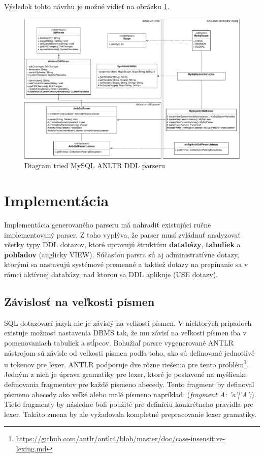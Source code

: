 Výsledok tohto návrhu je možné vidieť na obrázku \ref{fig:class_diagram_antlr}.
\begin{figure}[H]
\begin{center}
\includegraphics[width=15cm]{figures/antlr_design.pdf}
\caption{Diagram tried MySQL ANLTR DDL parseru}
\label{fig:class_diagram_antlr}
\end{center}
\end{figure}

\section{Implementácia}
Implementácia generovaného parseru má nahradiť existujúci ručne implementovaný parser. Z toho vyplýva, že parser musí zvládnuť analyzovať všetky typy DDL dotazov, ktoré upravujú štruktúru \textbf{databázy}, \textbf{tabuliek} a \textbf{pohľadov} (anglicky VIEW). Súčasťou parsra sú aj administratívne dotazy, ktorými sa nastavujú systémové premenné a taktiež dotazy na prepínanie sa v rámci aktívnej databázy, nad ktorou sa DDL aplikuje (USE dotazy).

\subsection{Závislosť na veľkosti písmen}
SQL dotazovací jazyk nie je závislý na veľkosti písmen. V niektorých prípadoch existuje možnosť nastavenia DBMS tak, že mu závisí na veľkosti písmen iba v pomenovaniach tabuliek a stĺpcov. Bohužiaľ parsre vygenerované ANTLR nástrojom sú závisle od veľkosti písmen podľa toho, ako sú definované jednotlivé u tokenov pre lexer. ANTLR podporuje dve rôzne riešenia pre tento problém\footnote{\url{https://github.com/antlr/antlr4/blob/master/doc/case-insensitive-lexing.md}}. Jedným z nich je úprava gramatiky pre lexer, ktoré je postavené na myšlienke definovania fragmentov pre každé písmeno abecedy. Tento fragment by definoval písmeno abecedy ako veľké alebo malé písmeno napríklad: (\textit{fragment A: 'a'|'A';}). Tieto fragmenty by následne boli použité pre definíciu konkrétneho pravidla pre lexer. Takáto zmena by ale vyžadovala kompletné prepracovanie lexer gramatiky.

